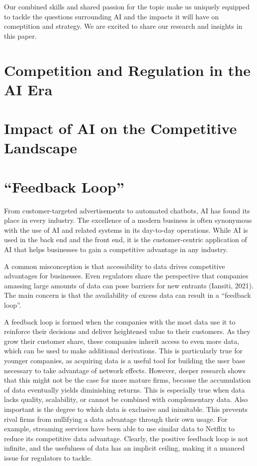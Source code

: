 \documentclass[
]{book}
\begin{document}
Our combined skills and shared passion for the topic make us uniquely equipped to tackle the questions surrounding AI and the impacts it will have on comeptition and strategy. We are excited to share our research and insights in this paper.

\hypertarget{competition-and-regulation-in-the-ai-era}{%
\section{Competition and Regulation in the AI Era}\label{competition-and-regulation-in-the-ai-era}}

\hypertarget{impact-of-ai-on-the-competitive-landscape}{%
\section{Impact of AI on the Competitive Landscape}\label{impact-of-ai-on-the-competitive-landscape}}

\hypertarget{feedback-loop}{%
\section{``Feedback Loop''}\label{feedback-loop}}

From customer-targeted advertisements to automated chatbots, AI has found its place in every industry. The excellence of a modern business is often synonymous with the use of AI and related systems in its day-to-day operations. While AI is used in the back end and the front end, it is the customer-centric application of AI that helps businesses to gain a competitive advantage in any industry.

A common misconception is that accessibility to data drives competitive advantages for businesses. Even regulators share the perspective that companies amassing large amounts of data can pose barriers for new entrants (Iansiti, 2021). The main concern is that the availability of excess data can result in a ``feedback loop''.

A feedback loop is formed when the companies with the most data use it to reinforce their decisions and deliver heightened value to their customers. As they grow their customer share, these companies inherit access to even more data, which can be used to make additional derivations. This is particularly true for younger companies, as acquiring data is a useful tool for building the user base necessary to take advantage of network effects. However, deeper research shows that this might not be the case for more mature firms, because the accumulation of data eventually yields diminishing returns. This is especially true when data lacks quality, scalability, or cannot be combined with complementary data. Also important is the degree to which data is exclusive and inimitable. This prevents rival firms from nullifying a data advantage through their own usage. For example, streaming services have been able to use similar data to Netflix to reduce its competitive data advantage. Clearly, the positive feedback loop is not infinite, and the usefulness of data has an implicit ceiling, making it a nuanced issue for regulators to tackle.
\end{document}
